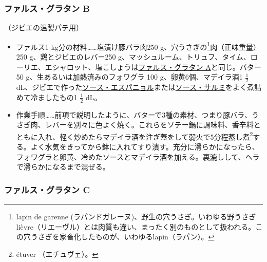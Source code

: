 \begin{recette}
\atoaki{}

\hypertarget{farce-gratin-b}{%
\subsubsection{ファルス・グラタン B}\label{farce-gratin-b}}


（ジビエの温製パテ用）


\begin{itemize}
\item
  ファルス1 kg分の材料\ldots{}\ldots{}塩漬け豚バラ肉250
  g、穴うさぎの\footnote{lapin de garenne
    (ラパンドガレーヌ)、野生の穴うさぎ。いわゆる野うさぎlièvre（リエーヴル）とは肉質も違い、まったく別のものとして扱われる。この穴うさぎを家畜化したものが、いわゆるlapin（ラパン）。}肉（正味重量）250
  g、鶏とジビエのレバー250
  g、マッシュルーム、トリュフ、タイム、ローリエ、エシャロット、塩こしょうは\protect\hyperlink{farce-gratin-a}{ファルス・グラタン
  A}と同じ。バター50 g、生あるいは加熱済みのフォワグラ 100
  g、卵黄6個、マデイラ酒1 \(\frac{1}{2}\)
  dL、ジビエで作った\protect\hyperlink{sauce-espagnole}{ソース・エスパニョル}または\protect\hyperlink{sauce-salmis}{ソース・サルミ}をよく煮詰めて冷ましたもの1
  \(\frac{1}{2}\) dL。
\item
  作業手順\ldots{}\ldots{}前項で説明したように、バターで3種の素材、つまり豚バラ、うさぎ肉、レバーを別々に色よく焼く。これらをソテー鍋に調味料、香辛料とともに入れ、軽く炒めたらマデイラ酒を注ぎ蓋をして弱火で5分程蒸し煮\footnote{étuver
    （エチュヴェ）。}する。よく水気をきってから鉢に入れてすり潰す。充分に滑らかになったら、フォワグラと卵黄、冷めたソースとマデイラ酒を加える。裏漉しして、ヘラで滑らかになるまで混ぜる。
\end{itemize}

\atoaki{}

\hypertarget{farce-gratin-c}{%
\subsubsection{ファルス・グラタン C}\label{farce-gratin-c}}




\end{recette}
